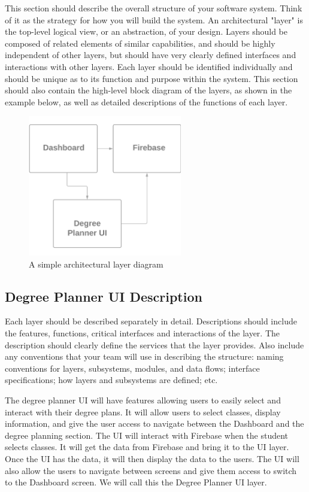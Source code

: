 This section should describe the overall structure of your software system. Think of it as the strategy for how you will build the system. An architectural "layer" is the top-level logical view, or an abstraction, of your design. Layers should be composed of related elements of similar capabilities, and should be highly independent of other layers, but should have very clearly defined interfaces and interactions with other layers. Each layer should be identified individually and should be unique as to its function and purpose within the system. This section should also contain the high-level block diagram of the layers, as shown in the example below, as well as detailed descriptions of the functions of each layer.

\begin{figure}[h!]
	\centering
 	\includegraphics[width=0.60\textwidth]{images/system_overview_pic}
 \caption{A simple architectural layer diagram}
\end{figure}

\subsection{Degree Planner UI Description}
Each layer should be described separately in detail. Descriptions should include the features, functions, critical interfaces and interactions of the layer. The description should clearly define the services that the layer provides. Also include any conventions that your team will use in describing the structure: naming conventions for layers, subsystems, modules, and data flows; interface specifications; how layers and subsystems are defined; etc.

    The degree planner UI will have features allowing users to easily select and interact with their degree plans. It will allow users to select classes, display information, and give the user access to navigate between the Dashboard and the degree planning section. The UI will interact with Firebase when the student selects classes. It will get the data from Firebase and bring it to the UI layer. Once the UI has the data, it will then display the data to the users. The UI will also allow the users to navigate between screens and give them access to switch to the Dashboard screen. We will call this the Degree Planner UI layer.


